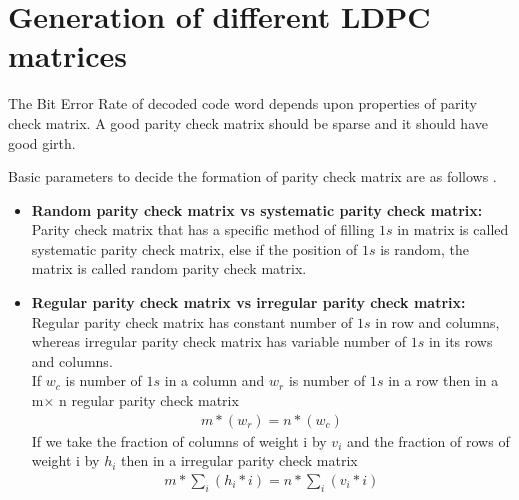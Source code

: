 
\chapter{Generation of different LDPC matrices} 

\label{Chapter2} 


The Bit Error Rate of decoded code word depends upon properties of parity check matrix. A good parity check matrix should be sparse and  it should have good girth.  

Basic parameters to decide the formation of parity check matrix are as follows . 
\begin{itemize}
\item  \textbf{Random parity check matrix vs systematic parity check matrix:} Parity check matrix that has a specific method of filling $1s$ in matrix is called systematic parity check matrix, else if the position of $1s$ is random, the matrix is called random parity check matrix.
\item\textbf{Regular parity check matrix vs irregular parity check matrix:} Regular parity check matrix has constant number of $1s$ in row and columns, whereas irregular parity check matrix has variable number of $1s$ in its rows and columns.\cite{9} \\
	If $w_c$ is number of $1s$ in a column and $w_r $ is number of $1s$ in a row then in a m$\times$ n regular parity check matrix
\begin{align}
 m * ( w_r ) = n * ( w_c )  
\end{align}
If we take the fraction of columns
of weight i by $v_i$ and the fraction of rows of weight i by $h_i$ then in a irregular parity check matrix
\begin{align} m * \sum_{i} (h_i*i) = n *\sum_{i} (v_i*i) 
\end{align}


\end{itemize} 

